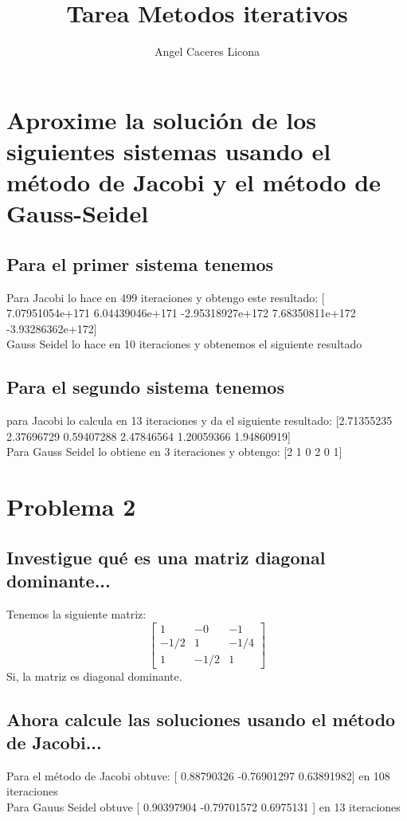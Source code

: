 \documentclass{article}
\begin{document}
\title{Tarea Metodos iterativos}
\author{Angel Caceres Licona}

\maketitle


\section{Aproxime la solución de los siguientes sistemas usando el método de Jacobi y el método de Gauss-Seidel}
\subsection{Para el primer sistema tenemos}
Para Jacobi lo hace en 499 iteraciones y obtengo este resultado: [ 7.07951054e+171  6.04439046e+171 -2.95318927e+172  7.68350811e+172
-3.93286362e+172]\\
Gauss Seidel lo hace en 10 iteraciones y obtenemos el siguiente resultado
\subsection{Para el segundo sistema tenemos}
para Jacobi lo calcula en 13 iteraciones y da el siguiente resultado: [2.71355235 2.37696729 0.59407288 2.47846564 1.20059366 1.94860919]\\
Para Gauss Seidel lo obtiene en 3 iteraciones y obtengo: [2 1 0 2 0 1]
\section{Problema 2}
\subsection{Investigue qué es una matriz diagonal dominante...}
Tenemos la siguiente matriz: \\
$$\begin{bmatrix}1&-0&-1\\-1/2&1&-1/4\\1&-1/2&1\end{bmatrix}$$
Si, la matriz es diagonal dominante.
\subsection{Ahora calcule las soluciones usando el método de Jacobi...}
Para el método de Jacobi obtuve: [ 0.88790326 -0.76901297  0.63891982] en 108 iteraciones\\
Para Gauus Seidel obtuve [ 0.90397904 -0.79701572  0.6975131 ] en 13 iteraciones
\end{document}
